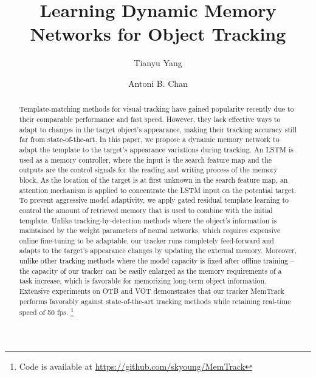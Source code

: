 \documentclass[runningheads]{llncs}
\newcommand{\tyy}[1]{\textcolor{black}{#1}}
\begin{document}
\title{Learning Dynamic Memory Networks for Object Tracking} 

\author{Tianyu Yang \and Antoni B. Chan}

\maketitle              %
\begin{abstract}
	Template-matching methods for visual tracking have gained popularity recently due to their comparable performance and fast speed. However, they lack effective ways to adapt to changes in the target object's appearance, making their tracking accuracy still far from state-of-the-art. In this paper, we propose a dynamic memory network to adapt the template to the target's appearance variations during tracking. An LSTM is used as a memory controller, where the input is the search feature map and the outputs are the control signals for the reading and writing process of the memory block. As the location of the target is at first unknown in the search feature map, an attention mechanism is applied to concentrate the LSTM input on the potential target. To prevent aggressive model adaptivity, we apply gated residual template learning to control the amount of retrieved memory that is used to combine with the initial template. Unlike tracking-by-detection methods where the object's information is maintained by the weight parameters of neural networks, which requires expensive online fine-tuning to be adaptable, our tracker runs completely feed-forward and adapts to the target's appearance changes by updating the external memory. Moreover, \tyy{unlike other tracking methods where the model capacity is fixed after offline training} -- the capacity of our tracker can be easily enlarged as the memory requirements of a task increase, which is favorable for memorizing long-term object information. Extensive experiments on OTB and VOT demonstrates that our tracker MemTrack performs favorably against state-of-the-art tracking methods while retaining real-time speed of 50 fps. \footnote{Code is available at \url{https://github.com/skyoung/MemTrack}}
	
\end{abstract}
\end{document}
